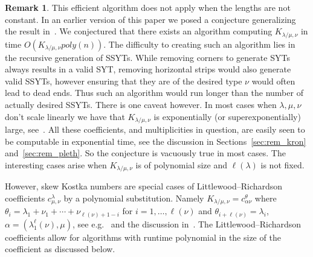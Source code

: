\documentclass[11pt]{amsart}
\theoremstyle{plain}
\theoremstyle{definition}
\newtheorem{rem}[thm]{Remark}
\numberwithin{equation}{section}
\newcommand{\la}{\lambda}
\newcommand{\al}{\alpha}
\newcommand{\poly}{poly}
\def\la{\lambda}
\begin{document}
\begin{rem}\label{rem:kostka_poly}
This efficient algorithm does not apply when the lengths are not constant. In an earlier version of this paper we posed  a conjecture generalizing the result in~\cite{LH24}. 
We conjectured that there exists an algorithm computing $K_{\la/\mu,\nu}$ in time $O(K_{\la/\mu,\nu} \poly(n))$. 
The difficulty to creating such an algorithm lies in the recursive generation of SSYTs. While removing corners to generate SYTs always results in a valid SYT, removing horizontal strips would also generate valid SSYTs, however ensuring that they are of the desired type $\nu$ would often lead to dead ends. Thus such an algorithm would run longer than the number of actually desired SSYTs.
There is one caveat however. In most cases when $\la,\mu,\nu$ don't scale linearly we have that $K_{\la/\mu,\nu}$ is exponentially (or superexponentially) large, see~\cite{PP20,Pan23}. All these coefficients, and multiplicities in question, are easily seen to be computable in exponential time, see the discussion in Sections~\ref{sec:rem_kron} and~\ref{sec:rem_pleth}. So the conjecture is vacuously true in most cases. The interesting cases arise when $K_{\la/\mu,\nu}$ is of polynomial size and $\ell(\la)$ is not fixed. 

However, skew Kostka numbers are special cases of Littlewood--Richardson coefficients $c^\la_{\mu,\nu}$ by a polynomial substitution.  Namely $K_{\la/\mu,\nu} = c^{\theta}_{\al\nu}$ where $\theta_i = \la_1 + \nu_1+\cdots+\nu_{\ell(\nu)+1-i}$ for $i=1,\ldots, \ell(\nu)$ and $\theta_{i+\ell(\nu)} = \la_i$, $\al= (\la_1^\ell(\nu), \mu)$, see e.g.~\cite{Pan23} and the discussion in~\cite{StaMO}.
The Littlewood--Richardson coefficients allow for algorithms with runtime polynomial in the size of the coefficient as discussed below. 
\end{rem}

\smallskip
\end{document}
